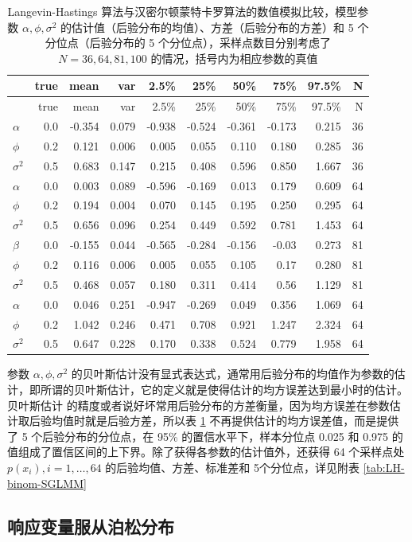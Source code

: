 \documentclass[12pt,a4paper,UTF8,twoside]{book}
\theoremstyle{definition}
\theoremstyle{definition}
\theoremstyle{definition}
\theoremstyle{remark}
\begin{document}
\begin{longtable}[]{@{}lrrrrrrrrr@{}}
\caption{\label{tab:MCLH-vs-NUTS} Langevin-Hastings
算法与汉密尔顿蒙特卡罗算法的数值模拟比较，模型参数
\(\alpha,\phi,\sigma^2\)
的估计值（后验分布的均值）、方差（后验分布的方差）和 5
个分位点（后验分布的 5 个分位点），采样点数目分别考虑了
\(N = 36, 64, 81, 100\) 的情况，括号内为相应参数的真值}\tabularnewline
\toprule
& true & mean & var & 2.5\% & 25\% & 50\% & 75\% & 97.5\% &
N\tabularnewline
\midrule
\endfirsthead
\toprule
& true & mean & var & 2.5\% & 25\% & 50\% & 75\% & 97.5\% &
N\tabularnewline
\midrule
\endhead
\(\alpha\) & 0.0 & -0.354 & 0.079 & -0.938 & -0.524 & -0.361 & -0.173 &
0.215 & 36\tabularnewline
\(\phi\) & 0.2 & 0.121 & 0.006 & 0.005 & 0.055 & 0.110 & 0.180 & 0.285 &
36\tabularnewline
\(\sigma^2\) & 0.5 & 0.683 & 0.147 & 0.215 & 0.408 & 0.596 & 0.850 &
1.667 & 36\tabularnewline
\(\alpha\) & 0.0 & 0.003 & 0.089 & -0.596 & -0.169 & 0.013 & 0.179 &
0.609 & 64\tabularnewline
\(\phi\) & 0.2 & 0.194 & 0.004 & 0.070 & 0.145 & 0.195 & 0.250 & 0.295 &
64\tabularnewline
\(\sigma^2\) & 0.5 & 0.656 & 0.096 & 0.254 & 0.449 & 0.592 & 0.781 &
1.453 & 64\tabularnewline
\(\beta\) & 0.0 & -0.155 & 0.044 & -0.565 & -0.284 & -0.156 & -0.03 &
0.273 & 81\tabularnewline
\(\phi\) & 0.2 & 0.116 & 0.006 & 0.005 & 0.055 & 0.105 & 0.17 & 0.280 &
81\tabularnewline
\(\sigma^2\) & 0.5 & 0.468 & 0.057 & 0.180 & 0.311 & 0.414 & 0.56 &
1.129 & 81\tabularnewline
\(\alpha\) & 0.0 & 0.046 & 0.251 & -0.947 & -0.269 & 0.049 & 0.356 &
1.069 & 64\tabularnewline
\(\phi\) & 0.2 & 1.042 & 0.246 & 0.471 & 0.708 & 0.921 & 1.247 & 2.324 &
64\tabularnewline
\(\sigma^2\) & 0.5 & 0.647 & 0.228 & 0.170 & 0.338 & 0.524 & 0.779 &
1.958 & 64\tabularnewline
\bottomrule
\end{longtable}

参数 \(\alpha,\phi,\sigma^2\)
的贝叶斯估计没有显式表达式，通常用后验分布的均值作为参数的估计，即所谓的贝叶斯估计，它的定义就是使得估计的均方误差达到最小时的估计。贝叶斯估计
的精度或者说好坏常用后验分布的方差衡量，因为均方误差在参数估计取后验均值时就是后验方差，所以表
\ref{tab:MCLH-vs-NUTS} 不再提供估计的均方误差值，而是提供了 5
个后验分布的分位点，在 95\% 的置信水平下，样本分位点 0.025 和 0.975
的值组成了置信区间的上下界。除了获得各参数的估计值外，还获得 64
个采样点处 \(p(x_i), i = 1, \ldots, 64\) 的后验均值、方差、标准差和
5个分位点，详见附表 \ref{tab:LH-binom-SGLMM}

\hypertarget{possion-sglmm}{%
\subsection{响应变量服从泊松分布}\label{possion-sglmm}}
\end{document}
